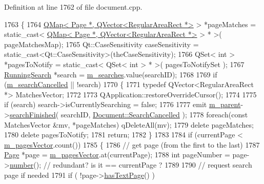 Definition at line 1762 of file document.\+cpp.


\begin{DoxyCode}
1763 \{
1764     \hyperlink{classQMap}{QMap< Page *, QVector<RegularAreaRect *>} > *pageMatches = \textcolor{keyword}{
      static\_cast<} \hyperlink{classQMap}{QMap< Page *, QVector<RegularAreaRect *>} \textcolor{keyword}{>} * >(
      pageMatchesMap);
1765     Qt::CaseSensitivity caseSensitivity = \textcolor{keyword}{static\_cast<}Qt::CaseSensitivity\textcolor{keyword}{>}(theCaseSensitivity);
1766     QSet< int > *pagesToNotify = \textcolor{keyword}{static\_cast<} QSet< int > * \textcolor{keyword}{>}( pagesToNotifySet );
1767     \hyperlink{structRunningSearch}{RunningSearch} *search = \hyperlink{classOkular_1_1DocumentPrivate_a42420dd45075092b921a829b8e9f2214}{m\_searches}.value(searchID);
1768 
1769     \textcolor{keywordflow}{if} (\hyperlink{classOkular_1_1DocumentPrivate_ad852d630ad63f8fd4ce1b2cc93179c91}{m\_searchCancelled} || !search)
1770     \{
1771         \textcolor{keyword}{typedef} QVector<RegularAreaRect *> MatchesVector;
1772 
1773         QApplication::restoreOverrideCursor();
1774 
1775         \textcolor{keywordflow}{if} (search) search->isCurrentlySearching = \textcolor{keyword}{false};
1776 
1777         emit \hyperlink{classOkular_1_1DocumentPrivate_ac921eda41c014869ffec96ecc569c713}{m\_parent}->\hyperlink{classOkular_1_1Document_ae938c994d20bdfef40caa3d37d28d92d}{searchFinished}( searchID, 
      \hyperlink{classOkular_1_1Document_aa9c2934f6abce7b0440ec74bb56eefbbacc76ba5b7c23f4d24515076e946373b4}{Document::SearchCancelled} );
1778         \textcolor{keywordflow}{foreach}(\textcolor{keyword}{const} MatchesVector &mv, *pageMatches) qDeleteAll(mv);
1779         \textcolor{keyword}{delete} pageMatches;
1780         \textcolor{keyword}{delete} pagesToNotify;
1781         \textcolor{keywordflow}{return};
1782     \}
1783 
1784     \textcolor{keywordflow}{if} (currentPage < \hyperlink{classOkular_1_1DocumentPrivate_a73b852d9a73ffe8061b66dbf9b290f17}{m\_pagesVector}.count())
1785     \{
1786         \textcolor{comment}{// get page (from the first to the last)}
1787         \hyperlink{classOkular_1_1Page}{Page} *page = \hyperlink{classOkular_1_1DocumentPrivate_a73b852d9a73ffe8061b66dbf9b290f17}{m\_pagesVector}.at(currentPage);
1788         \textcolor{keywordtype}{int} pageNumber = page->\hyperlink{classOkular_1_1Page_a6eee5f157a130b47d81ddd63e501664b}{number}(); \textcolor{comment}{// redundant? is it == currentPage ?}
1789 
1790         \textcolor{comment}{// request search page if needed}
1791         \textcolor{keywordflow}{if} ( !page->\hyperlink{classOkular_1_1Page_a44163bc0e76204a9d9c42da442ee734a}{hasTextPage}() )

\end{DoxyCode}
